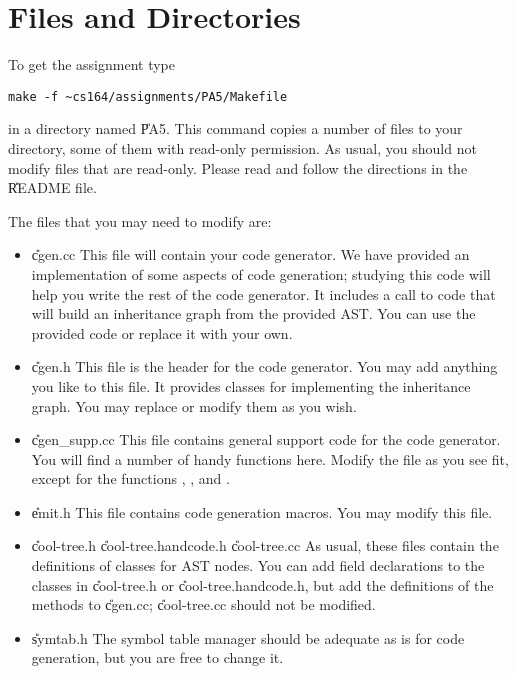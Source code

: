 \section{Files and Directories}
To get the assignment type
\begin{verbatim}
make -f ~cs164/assignments/PA5/Makefile
\end{verbatim}
in a directory named \U{PA5}.  This command copies a number
of files to your directory, some of them with read-only permission.
As usual, you should not modify files that are read-only.
Please read and follow the directions in the \U{README} file.

The files that you may need to modify are:
\begin{itemize}

\item \U{cgen.cc}
This file will contain your code generator.  We have provided an implementation
of some aspects of code generation; studying this code will help you write
the rest of the code generator.  It includes a call to code that will build
an inheritance graph from the provided AST.  You can use the provided code
or replace it with your own.

\item \U{cgen.h}
This file is the header for the code generator.  You may add anything you
like to this file.  It provides classes for implementing the inheritance
graph.  You may replace or modify them as you wish.

\item \U{cgen\_supp.cc} 
This file contains general support code for the code generator.  You will
find a number of handy functions here.  Modify the file as you
see fit, except for the functions ,
, and .

\item \U{emit.h}
This file contains code generation macros.  You may modify this file.

\item \U{cool-tree.h} \U{cool-tree.handcode.h} \U{cool-tree.cc}
As usual, these files contain the definitions of classes for AST nodes.
You can add field declarations to the classes in \U{cool-tree.h} or
\U{cool-tree.handcode.h}, but add the definitions of the
methods to \U{cgen.cc}; \U{cool-tree.cc} should not be modified.

\item \U{symtab.h}
The symbol table manager should be adequate as is for code generation, but
you are free to change it.


\end{itemize}
